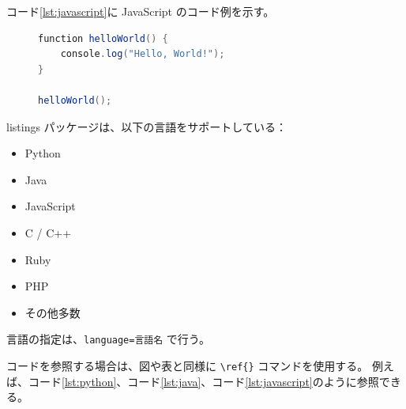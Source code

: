 
コード\ref{lst:javascript}に JavaScript のコード例を示す。

\begin{figure}[tp]
\begin{lstlisting}[caption={JavaScript のコード例}, label={lst:javascript}, language=java]
function helloWorld() {
    console.log("Hello, World!");
}

helloWorld();
\end{lstlisting}
\end{figure}


listings パッケージは、以下の言語をサポートしている：

\begin{itemize}
  \item Python
  \item Java
  \item JavaScript
  \item C / C++
  \item Ruby
  \item PHP
  \item その他多数
\end{itemize}

言語の指定は、\verb|language=言語名| で行う。


コードを参照する場合は、図や表と同様に \verb|\ref{}| コマンドを使用する。
例えば、コード\ref{lst:python}、コード\ref{lst:java}、コード\ref{lst:javascript}のように参照できる。
\fi